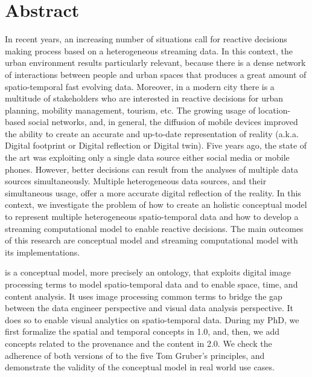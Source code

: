 \chapter*{Abstract}

In recent years, an increasing number of situations call for reactive decisions making process based on a heterogeneous streaming data.
In this context, the urban environment results particularly relevant, because there is a dense network of interactions between people and urban spaces that produces a great amount of spatio-temporal fast evolving data. Moreover, in a modern city there is a multitude of stakeholders who are interested in reactive decisions for urban planning, mobility management, tourism, etc.
The growing usage of location-based social networks, and, in general, the diffusion of mobile devices improved the ability to create an accurate and up-to-date representation of reality (a.k.a. Digital footprint or Digital reflection or Digital twin).
Five years ago, the state of the art was exploiting only a single data source either social media or mobile phones.
However, better decisions can result from the analyses of multiple data sources simultaneously.
Multiple heterogeneous data sources, and their simultaneous usage, offer a more accurate digital reflection of the reality.
In this context, we investigate the problem of how to create an holistic conceptual model to represent multiple heterogeneous spatio-temporal data and how to develop a streaming computational model to enable reactive decisions.
The main outcomes of this research are \frappe{} conceptual model and \river{} streaming computational model with its implementations.

\frappe{} is a conceptual model, more precisely an ontology, that exploits digital image processing terms to model spatio-temporal data and to enable space, time, and content analysis.
It uses image processing common terms to bridge the gap between the data engineer perspective and visual data analysis perspective.
It does so to enable visual analytics on spatio-temporal data.
During my PhD, we first formalize the spatial and temporal concepts in \frappe{} 1.0, and, then, we add concepts related to the provenance and the content in \frappe{} 2.0.
We check the adherence of both versions of \frappe{} to the five Tom Gruber's principles, and demonstrate the validity of the conceptual model in real world use cases.

